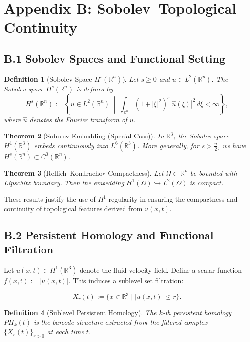 \documentclass[11pt]{article}
\newtheorem{theorem}{Theorem}[section]
\newtheorem{definition}[theorem]{Definition}
\begin{document}
\section*{Appendix B: Sobolev–Topological Continuity}

\subsection*{B.1 Sobolev Spaces and Functional Setting}

\begin{definition}[Sobolev Space $H^s(\mathbb{R}^n)$]
Let $s \geq 0$ and $u \in L^2(\mathbb{R}^n)$. The Sobolev space $H^s(\mathbb{R}^n)$ is defined by
\[
H^s(\mathbb{R}^n) := \left\{ u \in L^2(\mathbb{R}^n) \;\middle|\; \int_{\mathbb{R}^n} (1 + |\xi|^2)^s |\widehat{u}(\xi)|^2 \, d\xi < \infty \right\},
\]
where $\widehat{u}$ denotes the Fourier transform of $u$.
\end{definition}

\begin{theorem}[Sobolev Embedding (Special Case)]
In $\mathbb{R}^3$, the Sobolev space $H^1(\mathbb{R}^3)$ embeds continuously into $L^6(\mathbb{R}^3)$.  
More generally, for $s > \frac{n}{2}$, we have $H^s(\mathbb{R}^n) \subset C^0(\mathbb{R}^n)$.
\end{theorem}

\begin{theorem}[Rellich–Kondrachov Compactness]
Let $\Omega \subset \mathbb{R}^n$ be bounded with Lipschitz boundary. Then the embedding $H^1(\Omega) \hookrightarrow L^2(\Omega)$ is compact.
\end{theorem}

These results justify the use of $H^1$ regularity in ensuring the compactness and continuity of topological features derived from $u(x,t)$.

\subsection*{B.2 Persistent Homology and Functional Filtration}

Let $u(x,t) \in H^1(\mathbb{R}^3)$ denote the fluid velocity field. Define a scalar function $f(x,t) := |u(x,t)|$. This induces a sublevel set filtration:

\[
X_r(t) := \{ x \in \mathbb{R}^3 \mid |u(x,t)| \leq r \}.
\]

\begin{definition}[Sublevel Persistent Homology]
The $k$-th persistent homology $PH_k(t)$ is the barcode structure extracted from the filtered complex $\{ X_r(t) \}_{r > 0}$ at each time $t$.
\end{definition}
\end{document}
